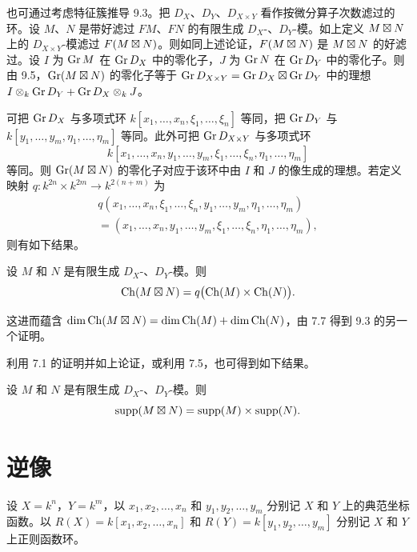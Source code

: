 也可通过考虑特征簇推导 9.3。把 $D_X$、$D_Y$、$D_{X\times Y}$ 看作按微分算子次数滤过的环。设 $M$、$N$ 是带好滤过 $F M$、$F N$ 的有限生成 $D_X$-、$D_Y$-模。如上定义 $M\mathbin{\boxtimes} N$ 上的 $D_{X\times Y}$-模滤过 $F(M\mathbin{\boxtimes} N)$。则如同上述论证，$F(M\mathbin{\boxtimes} N)$ 是 $M\mathbin{\boxtimes} N$ 的好滤过。设 $I$ 为 $\operatorname{Gr} M$ 在 $\operatorname{Gr} D_X$ 中的零化子，$J$ 为 $\operatorname{Gr} N$ 在 $\operatorname{Gr} D_Y$ 中的零化子。则由 9.5，$\operatorname{Gr}(M\mathbin{\boxtimes} N)$ 的零化子等于 $\operatorname{Gr} D_{X\times Y}=\operatorname{Gr} D_X\mathbin{\boxtimes}\operatorname{Gr} D_Y$ 中的理想 $I\otimes_k\operatorname{Gr} D_Y+\operatorname{Gr} D_X\otimes_k J$。

可把 $\operatorname{Gr} D_X$ 与多项式环 $k[x_1,\dots,x_n,\xi_1,\dots,\xi_n]$ 等同，把 $\operatorname{Gr} D_Y$ 与
$k[y_1,\dots,y_m,\eta_1,\dots,\eta_m]$ 等同。此外可把 $\operatorname{Gr} D_{X\times Y}$ 与多项式环
$$k[x_1,\dots,x_n,y_1,\dots,y_m,\xi_1,\dots,\xi_n,\eta_1,\dots,\eta_m]$$
等同。则 $\operatorname{Gr}(M\mathbin{\boxtimes} N)$ 的零化子对应于该环中由 $I$ 和 $J$ 的像生成的理想。若定义映射
$q:k^{2n}\times k^{2m}\to k^{2(n+m)}$ 为
\begin{multline*}
q(x_1,\dots,x_n,\xi_1,\dots,\xi_n,y_1,\dots,y_m,\eta_1,\dots,\eta_m)\\
=(x_1,\dots,x_n,y_1,\dots,y_m,\xi_1,\dots,\xi_n,\eta_1,\dots,\eta_m),
\end{multline*}
则有如下结果。

\begin{theorem}
设 $M$ 和 $N$ 是有限生成 $D_X$-、$D_Y$-模。则
$$\operatorname{Ch}(M\mathbin{\boxtimes} N)=q\bigl(\operatorname{Ch}(M)\times\operatorname{Ch}(N)\bigr).$$
\end{theorem}

这进而蕴含 $\dim\operatorname{Ch}(M\mathbin{\boxtimes} N)=\dim\operatorname{Ch}(M)+\dim\operatorname{Ch}(N)$，由 7.7 得到 9.3 的另一个证明。

利用 7.1 的证明并如上论证，或利用 7.5，也可得到如下结果。

\begin{proposition}
设 $M$ 和 $N$ 是有限生成 $D_X$-、$D_Y$-模。则
$$\operatorname{supp}(M\mathbin{\boxtimes} N)=\operatorname{supp}(M)\times\operatorname{supp}(N).$$
\end{proposition}

\section{逆像}

设 $X=k^n$，$Y=k^m$，以 $x_1,x_2,\dots,x_n$ 和 $y_1,y_2,\dots,y_m$ 分别记 $X$ 和 $Y$ 上的典范坐标函数。以 $R(X)=k[x_1,x_2,\dots,x_n]$ 和 $R(Y)=k[y_1,y_2,\dots,y_m]$ 分别记 $X$ 和 $Y$ 上正则函数环。

